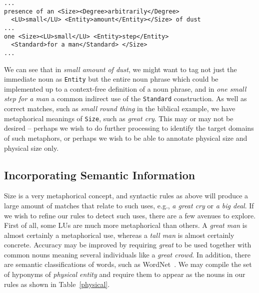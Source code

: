 \documentclass{llncs}
\begin{document}
\begin{center}
  \small
  \begin{framed}
\begin{verbatim}
...
presence of an <Size><Degree>arbitrarily</Degree>
  <LU>small</LU> <Entity>amount</Entity></Size> of dust
...
one <Size><LU>small</LU> <Entity>step</Entity>
  <Standard>for a man</Standard> </Size>
...
\end{verbatim}
  \end{framed}
\end{center}
  \normalsize

\noindent We can see that in \emph{small amount of dust}, we might want to
tag not just the immediate noun as \verb+Entity+ but the entire noun phrase
which could be implemented up to a context-free definition of a noun phrase,
and in \emph{one small step for a man} a common indirect use of the \verb+Standard+
construction. As well as correct matches, such as \emph{small round thing} in the biblical
example, we have metaphorical meanings of \verb+Size+, such as \emph{great cry}.
This may or may not be desired -- perhaps we wish to do further processing to
identify the target domains of such metaphors, or perhaps we wish to be able
to annotate physical size and physical size only.

\subsection{Incorporating Semantic Information}

Size is a very metaphorical concept, and syntactic rules as above will produce a large amount of matches that relate to such uses, e.g., \emph{a great cry} or \emph{a big deal}. If we wish to refine our rules to detect such uses, there are a few avenues to explore. First of all, some LUs are much more metaphorical than others. A \emph{great man} is almost certainly a metaphorical use, whereas a \emph{tall man} is almost certainly concrete. Accuracy may be improved by requiring \emph{great} to be used together with common nouns meaning several individuals like a \emph{great crowd}. In addition, there are semantic classifications of words, such as WordNet~\cite{wordnet}. We may compile the set of hyponyms of \emph{physical entity} and require them to appear as the nouns in our rules as shown in Table~\ref{physical}.
\end{document}
